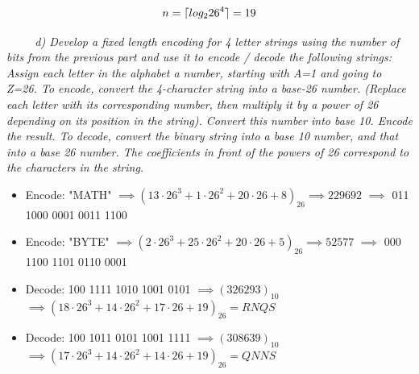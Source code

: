 \documentclass[12pt, letterpaper]{article}
\DeclarePairedDelimiter{\ceil}{\lceil}{\rceil}
\begin{document}
\[ n = \ceil{ log_2{26^4} } = 19 \]

\-\ \newline
\-\ \newline
\-\ \it{ d) Develop a fixed length encoding for 4 letter strings using the number of bits from the previous part and use it to encode / decode the following strings: }
\-\ \newline \newline
\textnormal{ Assign each letter in the alphabet a number, starting with A=1 and going to Z=26. } \newline \newline
\textnormal{To encode, convert the 4-character string into a base-26 number. (Replace each letter with its corresponding number, then multiply it by a power of 26 depending on its position in the string). Convert this number into base 10. Encode the result.} \newline \newline
\textnormal{To decode, convert the binary string into a base 10 number, and that into a base 26 number. The coefficients in front of the powers of 26 correspond to the characters in the string. } \newline

\begin{itemize} 
\item Encode: "MATH"
\( \implies (13 \cdot 26^3 + 1 \cdot 26^2 + 20 \cdot 26 + 8)_{26} \implies 229692 \) \newline
\( \implies \) 011 1000 0001 0011 1100 \newline

\item Encode: "BYTE"
\( \implies (2\cdot26^3 + 25\cdot 26^2 + 20\cdot 26 + 5)_{26} \implies 52577\) \newline
\( \implies \) 000 1100 1101 0110 0001 \newline

\item Decode: 100 1111 1010 1001 0101
\( \implies (326293)_{10} \) \newline
\( \implies (18\cdot26^3 + 14\cdot26^2 + 17\cdot26 + 19)_{26} = RNQS \) \newline

\item Decode: 100 1011 0101 1001 1111
\( \implies (308639)_{10} \) \newline
\( \implies (17\cdot26^3 + 14\cdot26^2 + 14\cdot26 + 19)_{26} = QNNS \) \newline

\end{itemize}
\end{document}
